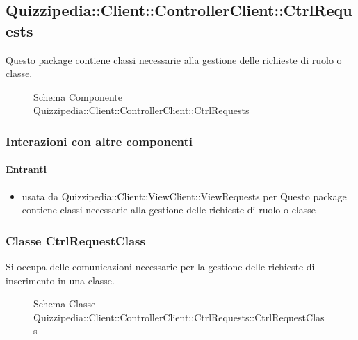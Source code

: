 \subsection{Quizzipedia::Client::ControllerClient::CtrlRequests}
Questo package contiene classi necessarie alla gestione delle richieste di ruolo o classe.
\begin{figure}[H]
\centering
\noindent{}
\caption[Schema Componente Quizzipedia::Client::ControllerClient::CtrlRequests]{Schema Componente Quizzipedia::Client::ControllerClient::CtrlRequests}
\end{figure}
\subsubsection{Interazioni con altre componenti}
\paragraph{Entranti}
\begin{itemize}
\item usata da Quizzipedia::Client::ViewClient::ViewRequests per Questo package contiene classi necessarie alla gestione delle richieste di ruolo o classe
\end{itemize}
\subsubsection{Classe CtrlRequestClass}
Si occupa delle comunicazioni necessarie per la gestione delle richieste di inserimento in una classe.
\begin{figure}[H]
\centering
\noindent{}
\caption[Schema Classe CtrlRequestClass]{Schema Classe Quizzipedia::Client::ControllerClient::CtrlRequests::CtrlRequestClass}
\end{figure}
